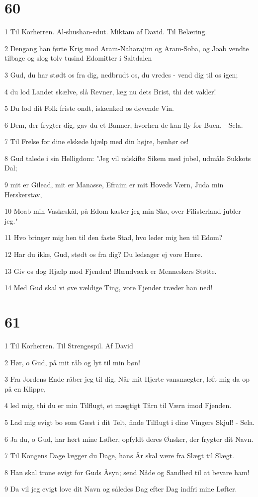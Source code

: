 \chapter{60}

\par 1 Til Korherren. Al-shushan-edut. Miktam af David. Til Belæring.
\par 2 Dengang han førte Krig mod Aram-Naharajim og Aram-Soba, og Joab vendte tilbage og slog tolv tusind Edomitter i Saltdalen
\par 3 Gud, du har stødt os fra dig, nedbrudt os, du vredes - vend dig til os igen;
\par 4 du lod Landet skælve, slå Revner, læg nu dets Brist, thi det vakler!
\par 5 Du lod dit Folk friste ondt, iskænked os døvende Vin.
\par 6 Dem, der frygter dig, gav du et Banner, hvorhen de kan fly for Buen. - Sela.
\par 7 Til Frelse for dine elskede hjælp med din højre, bønhør os!
\par 8 Gud talede i sin Helligdom: "Jeg vil udskifte Sikem med jubel, udmåle Sukkots Dal;
\par 9 mit er Gilead, mit er Manasse, Efraim er mit Hoveds Værn, Juda min Herskerstav,
\par 10 Moab min Vaskeskål, på Edom kaster jeg min Sko, over Filisterland jubler jeg."
\par 11 Hvo bringer mig hen til den faste Stad, hvo leder mig hen til Edom?
\par 12 Har du ikke, Gud, stødt os fra dig? Du ledsager ej vore Hære.
\par 13 Giv os dog Hjælp mod Fjenden! Blændværk er Menneskers Støtte.
\par 14 Med Gud skal vi øve vældige Ting, vore Fjender træder han ned!

\chapter{61}

\par 1 Til Korherren. Til Strengespil. Af David
\par 2 Hør, o Gud, på mit råb og lyt til min bøn!
\par 3 Fra Jordens Ende råber jeg til dig. Når mit Hjerte vansmægter, løft mig da op på en Klippe,
\par 4 led mig, thi du er min Tilflugt, et mægtigt Tårn til Værn imod Fjenden.
\par 5 Lad mig evigt bo som Gæst i dit Telt, finde Tilflugt i dine Vingers Skjul! - Sela.
\par 6 Ja du, o Gud, har hørt mine Løfter, opfyldt deres Ønsker, der frygter dit Navn.
\par 7 Til Kongens Dage lægger du Dage, hans År skal være fra Slægt til Slægt.
\par 8 Han skal trone evigt for Guds Åsyn; send Nåde og Sandhed til at bevare ham!
\par 9 Da vil jeg evigt love dit Navn og således Dag efter Dag indfri mine Løfter.

